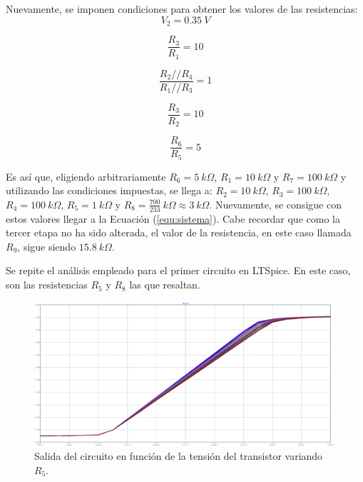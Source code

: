 \documentclass[a4paper]{article}
\begin{document}
Nuevamente, se imponen condiciones para obtener los valores de las resistencias:
\begin{equation}
	V_2 = 0.35 \ V
	\label{equ:condm2-1}
\end{equation}

\begin{equation}
	\frac{R_3}{R_1} = 10
	\label{equ:condm2-2}
\end{equation}

\begin{equation}
	\frac{R_2 // R_4}{R_1 // R_3} = 1
	\label{equ:condm3-3}
\end{equation}

\begin{equation}
	\frac{R_3}{R_2} = 10
	\label{equ:condm2-4}
\end{equation}

\begin{equation}
	\frac{R_6}{R_5} = 5
	\label{equ:condm2-5}
\end{equation}

Es así que, eligiendo arbitrariamente $R_6 = 5 \ k\Omega$, $R_1 = 10 \ k\Omega$ y $R_7 = 100 \ k\Omega$ y utilizando las condiciones impuestas, se llega a: $R_2 = 10 \ k\Omega$, $R_3 = 100 \ k\Omega$, $R_4 = 100 \ k\Omega$, $R_5 = 1 \ k\Omega$ y $R_8 = \frac{700}{233} \ k\Omega \approx 3 \ k\Omega$. Nuevamente, se consigue con estos valores llegar a la Ecuación (\ref{equ:sistema}). Cabe recordar que como la tercer etapa no ha sido alterada, el valor de la resistencia, en este caso llamada $R_9$, sigue siendo $15.8 \ k\Omega$.

Se repite el análisis empleado para el primer circuito en LTSpice. En este caso, son las resistencias $R_5$ y $R_8$ las que resaltan.

\begin{figure}[H]
	\centering
	\includegraphics[width=0.99\textwidth]{Ejercicio6/Imagenes/StepR5-M2.png}
	\caption{Salida del circuito en función de la tensión del transistor variando $R_5$.}
	\label{fig:r5-M2}
\end{figure}
\end{document}

